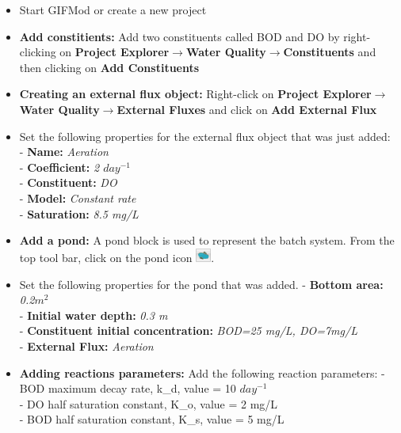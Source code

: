 \begin{itemize}

\item Start GIFMod or create a new project
\item \textbf{Add constitients: } Add two constituents called BOD and DO by right-clicking on \textbf{Project Explorer}$\rightarrow$\textbf{Water Quality}$\rightarrow$\textbf{Constituents} and then clicking on \textbf{Add Constituents}
\item \textbf{Creating an external flux object: } Right-click on \textbf{Project Explorer}$\rightarrow$\textbf{Water Quality}$\rightarrow$\textbf{External Fluxes} and click on \textbf{Add External Flux} 
\item Set the following properties for the external flux object that was just added:  \\
- \textbf{Name: } \textit{Aeration} \\
- \textbf{Coefficient: } \textit{2 $day^{-1}$} \\
- \textbf{Constituent: } \textit{DO}\\
- \textbf{Model: } \textit{Constant rate} \\
- \textbf{Saturation: } \textit{8.5 mg/L}\\


\item \textbf{Add a pond: } A pond block is used to represent the batch system. From the top tool bar, click on the pond icon \includegraphics[width=0.5cm]{Icons/pond_icon.png}.
\item Set the following properties for the pond that was added. 
- \textbf{Bottom area: } \textit{0.2$m^2$} \\
- \textbf{Initial water depth: } \textit{0.3 m} \\
- \textbf{Constituent initial concentration: } \textit{BOD=25 mg/L, DO=7mg/L}\\
- \textbf{External Flux: } \textit{Aeration} \\

\item \textbf{Adding reactions parameters: } Add the following reaction parameters: 
- BOD maximum decay rate, k\_d, value = 10 $day^{-1}$\\
- DO half saturation constant, K\_o, value = 2 mg/L \\
- BOD half saturation constant, K\_s, value = 5 mg/L \\


\end{itemize}
